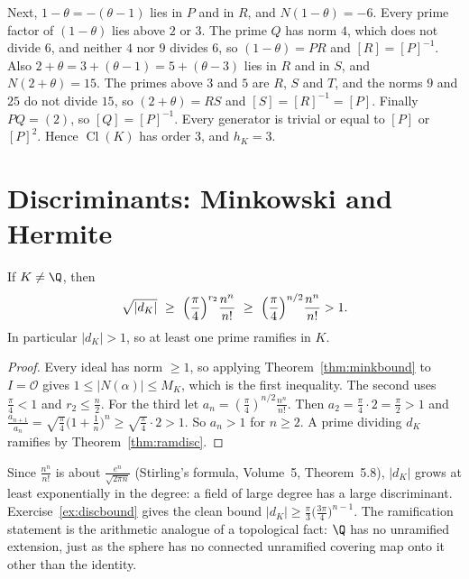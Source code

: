 Next, $1-\theta=-(\theta-1)$ lies in $P$ and in $R$, and $N(1-\theta)=-6$. Every prime factor of $(1-\theta)$ lies
above $2$ or $3$. The prime $Q$ has norm $4$, which does not divide $6$, and neither $4$ nor $9$ divides $6$, so
$(1-\theta)=PR$ and $[R]=[P]^{-1}$. Also $2+\theta=3+(\theta-1)=5+(\theta-3)$ lies in $R$ and in $S$, and
$N(2+\theta)=15$. The primes above $3$ and $5$ are $R$, $S$ and $T$, and the norms $9$ and $25$ do not divide $15$,
so $(2+\theta)=RS$ and $[S]=[R]^{-1}=[P]$. Finally $PQ=(2)$, so $[Q]=[P]^{-1}$. Every generator is trivial or equal
to $[P]$ or $[P]^2$.
Hence $\operatorname{Cl}(K)$ has order $3$, and $h_K=3$.

\section{Discriminants: Minkowski and Hermite}

\begin{theorem}[Minkowski]\label{thm:dkbig}
If $K\ne\Q$, then
\[
\sqrt{|d_K|}\ \ge\ \Bigl(\frac\pi4\Bigr)^{r_2}\frac{n^n}{n!}\ \ge\ \Bigl(\frac\pi4\Bigr)^{n/2}\frac{n^n}{n!}>1.
\]
In particular $|d_K|>1$, so at least one prime ramifies in $K$.
\end{theorem}
\begin{proof}
Every ideal has norm $\ge1$, so applying Theorem~\ref{thm:minkbound} to $I=\mathcal O$ gives $1\le|N(\alpha)|\le M_K$,
which is the first inequality. The second uses $\frac\pi4<1$ and $r_2\le\frac n2$. For the third let
$a_n=(\frac\pi4)^{n/2}\frac{n^n}{n!}$. Then $a_2=\frac\pi4\cdot2=\frac\pi2>1$ and $\frac{a_{n+1}}{a_n}=\sqrt{\frac\pi4}
\bigl(1+\frac1n\bigr)^n\ge\sqrt{\frac\pi4}\cdot2>1$. So $a_n>1$ for $n\ge2$. A prime dividing $d_K$ ramifies by
Theorem~\ref{thm:ramdisc}.
\end{proof}

Since $\frac{n^n}{n!}$ is about $\frac{e^n}{\sqrt{2\pi n}}$ (Stirling's formula, Volume~5, Theorem~5.8), $|d_K|$ grows at least exponentially in the
degree: a field of large degree has a large discriminant. Exercise~\ref{ex:discbound} gives the clean bound
$|d_K|\ge\frac\pi3\bigl(\frac{3\pi}4\bigr)^{n-1}$. The ramification statement is the arithmetic analogue of a
topological fact: $\Q$ has no unramified extension, just as the sphere has no connected unramified covering map onto it
other than the identity.

